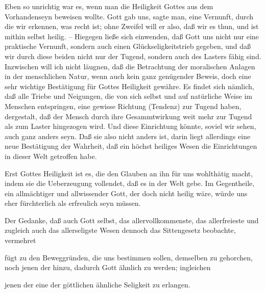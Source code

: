 \begin{RWanm} 
Eben so unrichtig war es, wenn man die Heiligkeit Gottes aus dem Vorhandenseyn  beweisen wollte. Gott gab uns, sagte man, eine Vernunft, durch die wir erkennen, was recht ist; ohne Zweifel will er also, daß wir es thun, und ist mithin selbst heilig. -- Hiegegen ließe sich einwenden, daß Gott uns nicht nur eine praktische Vernunft, sondern auch einen Glückseligkeitstrieb gegeben, und daß wir durch diese beiden nicht nur der Tugend, sondern auch des Lasters fähig sind. Inzwischen will ich nicht läugnen, daß die Betrachtung der moralischen Anlagen in der menschlichen Natur, wenn auch kein ganz genügender Beweis, doch eine sehr wichtige Bestätigung für Gottes Heiligkeit gewähre. Es findet sich nämlich, daß alle Triebe und Neigungen, die von sich selbst und auf natürliche Weise im Menschen entspringen, eine gewisse Richtung (Tendenz) zur Tugend haben, dergestalt, daß der Mensch durch ihre Gesammtwirkung weit mehr zur Tugend als zum Laster hingezogen wird. Und diese Einrichtung könnte, soviel wir sehen, auch ganz anders seyn. Daß sie also nicht anders ist, darin liegt allerdings eine neue Bestätigung der Wahrheit, daß ein höchst heiliges Wesen die Einrichtungen in dieser Welt getroffen habe.
\end{RWanm}

\begin{aufza}
\item Erst Gottes Heiligkeit ist es, die den Glauben an ihn für uns wohlthätig macht, indem sie die Ueberzeugung vollendet, daß es in der Welt  gebe. Im Gegentheile, ein allmächtiger und allwissender Gott, der doch nicht heilig wäre, würde uns eher fürchterlich als erfreulich seyn müssen.
\item Der Gedanke, daß auch Gott selbst, das allervollkommenste, das allerfreieste und zugleich auch das allerseligste Wesen dennoch das Sittengesetz beobachte, vermehret
\begin{aufzb}
\item {}
\item fügt zu den Beweggründen, die uns bestimmen sollen, demselben zu gehorchen, noch jenen der  hinzu, dadurch Gott ähnlich zu werden; ingleichen
\item jenen der  eine der göttlichen ähnliche Seligkeit zu erlangen.~
\end{aufzb}
\end{aufza}

